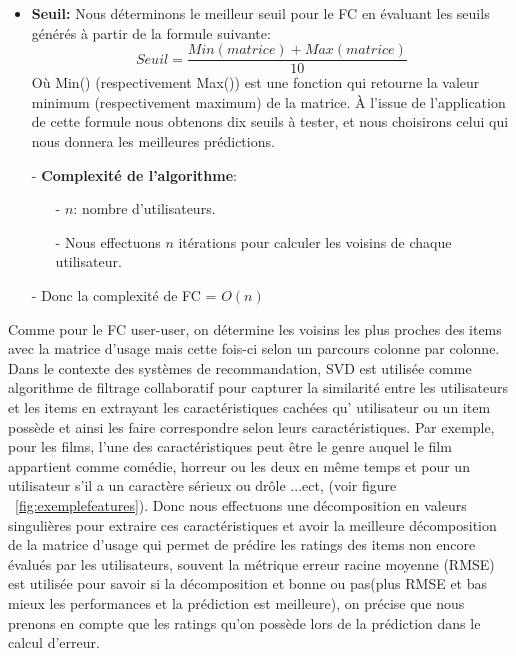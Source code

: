 \begin{itemize}
	\item \textbf{Seuil:} Nous déterminons le meilleur seuil pour le FC en évaluant les seuils générés à partir de la formule suivante:
	\begin{equation}
	Seuil=\frac{Min(matrice) + Max(matrice)}{10}
	\end{equation}
	Où Min() (respectivement Max()) est une fonction qui retourne la valeur minimum (respectivement maximum) de la matrice.
	À l'issue de l'application de cette formule nous obtenons dix seuils à tester, et nous choisirons celui qui nous donnera les meilleures prédictions. 
\end{itemize}

\begin{itemize}
	\item [-] \textbf{Complexité de l'algorithme}:
	\begin{itemize}
		\item [-] $n$: nombre d'utilisateurs.
		\item [-] Nous effectuons $n$ itérations pour calculer les voisins de chaque utilisateur.
	\end{itemize}
	\item [-] Donc la complexité de FC = $O(n)$
\end{itemize}


Comme pour le FC user-user, on détermine les voisins les plus proches des items avec la matrice d'usage mais cette fois-ci selon un parcours colonne par colonne.
Dans le contexte des systèmes de recommandation, SVD est utilisée comme algorithme de filtrage collaboratif pour capturer la similarité entre les utilisateurs et les items en extrayant les caractéristiques cachées qu' utilisateur ou un item  possède et ainsi les faire correspondre selon leurs caractéristiques. 
Par exemple, pour les films, l'une des caractéristiques peut  être le genre auquel le film appartient comme comédie, horreur ou les deux en même temps et pour un utilisateur s'il a un caractère sérieux ou drôle ...ect, (voir figure ~\ref{fig:exemplefeatures}). 
Donc nous effectuons une décomposition en valeurs singulières pour extraire ces caractéristiques et avoir la meilleure décomposition de la matrice d'usage qui permet de prédire les ratings des items non encore évalués par les utilisateurs, souvent la métrique erreur racine moyenne (RMSE) est utilisée pour savoir si la décomposition et bonne ou pas(plus RMSE et bas mieux les performances et la prédiction est meilleure), on précise que nous prenons en compte que les ratings qu'on possède lors de la prédiction dans le calcul d'erreur.


